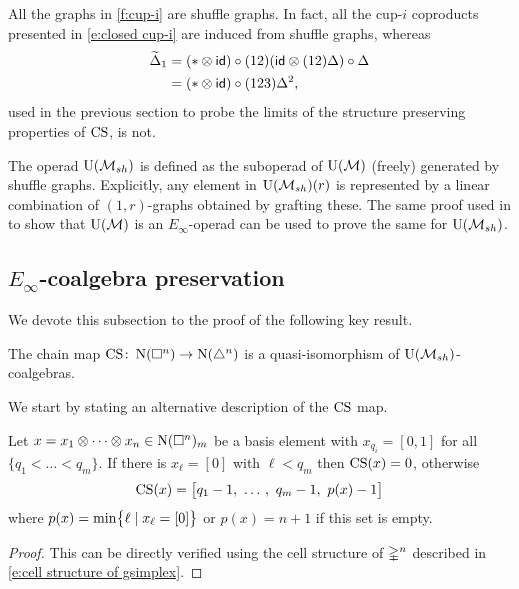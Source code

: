 \begin{example*}
	All the graphs in \cref{f:cup-i} are shuffle graphs.
	In fact, all the cup-$i$ coproducts presented in \cref{e:closed cup-i} are induced from shuffle graphs, whereas
	\begin{align*}
		\widetilde\Delta_1 &=
		(\ast \ot \id) \circ (12) (\id \ot (12) \Delta) \circ \Delta \\ &=
		(\ast \ot \id) \circ (123) \Delta^2,
	\end{align*}
	used in the previous section to probe the limits of the structure preserving properties of $\CS$, is not.
\end{example*}

The operad $\UMsh$ is defined as the suboperad of $\UM$ (freely) generated by shuffle graphs.
Explicitly, any element in $\UMsh(r)$ is represented by a linear combination of $(1,r)$-graphs obtained by grafting these.
The same proof used in \cite[p.5]{medina2020prop1} to show that $\UM$ is an $E_\infty$-operad can be used to prove the same for $\UMsh$.

\subsection{$E_\infty$-coalgebra preservation} \label{ss:e-infty preservation}

We devote this subsection to the proof of the following key result.

\begin{theorem} \label{t:main local}
	The chain map $\CS \colon \chains(\cube^n) \to \chains(\simplex^n)$ is a quasi-isomorphism of $\UMsh$-coalgebras.
\end{theorem}

We start by stating an alternative description of the $\CS$ map.

\begin{lemma} \label{l:cs explicit}
	Let $x = x_1 \ot \cdots \ot x_n \in \chains(\cube^n)_m$ be a basis element with $x_{q_i} = [0,1]$ for all $\{q_1 < \dots < q_m\}$.
	If there is $x_\ell = [0]$ with $\ell < q_m$ then $\CS(x) = 0$, otherwise
	\[
	\CS(x) = \big[ q_1-1, \ \dots \, , \ q_m-1, \ p(x)-1 \big]
	\]
	where $p(x) = \min \set[\big]{\ell \mid x_\ell = [0]}$ or $p(x) = n+1$ if this set is empty.
\end{lemma}

\begin{proof}
	This can be directly verified using the cell structure of $\gsimplex^n$ described in \cref{e:cell structure of gsimplex}.
\end{proof}

